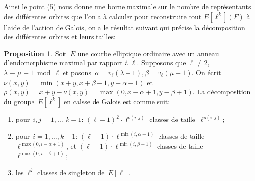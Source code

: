 \documentclass[10pt,a4paper]{book}
\theoremstyle{plain}
\theoremstyle{definition}
\theoremstyle{definition}
\theoremstyle{definition}
\newtheorem{prop}[thm]{Proposition}
\theoremstyle{definition}
\theoremstyle{remark}
\theoremstyle{remark}
\theoremstyle{definition}
\begin{document}
Ainsi le point (5) nous donne une borne maximale sur le nombre de représentants des différentes orbites que l'on a à calculer pour reconstruire tout $E[\ell^{k}](F)$ à l'aide de l'action de Galois, on a le résultat suivant qui précise la décomposition des différentes orbites et leurs tailles:

\begin{prop}\label{prop:orbites-l-torsion}
Soit~$E$ une courbe elliptique ordinaire avec un anneau d'endomorphisme maximal
 par rapport à $\ell$.
Supposons que $\ell \neq 2$, $\lambda \equiv \mu \equiv 1 \bmod \ell$ et posons~$\alpha = v_{\ell}(\lambda-1), \beta=v_{\ell}(\mu-1)$.
On écrit~$\nu(x, y) = \min (x+y, x+\beta-1, y+\alpha-1)$
et~$\rho(x, y) = x+y - \nu(x, y) = \max (0, x-\alpha+1, y-\beta+1)$.
La décomposition du groupe~$E[\ell^k]$ en calsse de Galois est comme suit:
\begin{enumerate}
\item pour~$i, j = 1, …, k-1$:
$(\ell-1)^2 \cdot \ell^{\nu(i,j)}$ classes de taille~$\ell^{\rho(i,j)}$;
\item pour~$i = 1, …, k-1$:
$(\ell-1) \cdot \ell^{\min (i, \alpha-1)}$ classes de taille~$\ell^{\max (0, i-\alpha+1)}$, et
$(\ell-1) \cdot \ell^{\min (i, \beta-1)}$ classes de taille~$\ell^{\max (0, i-\beta+1)}$;
\item les $\ell^2$ classes de singleton de~$E[\ell]$.
\end{enumerate}
\end{prop}
\end{document}
